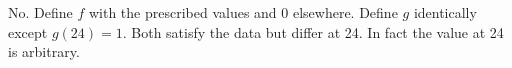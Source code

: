 No. Define $f$ with the prescribed values and 0 elsewhere. Define $g$ identically except $g(24)=1$. Both satisfy the data but differ at 24. In fact the value at 24 is arbitrary.
